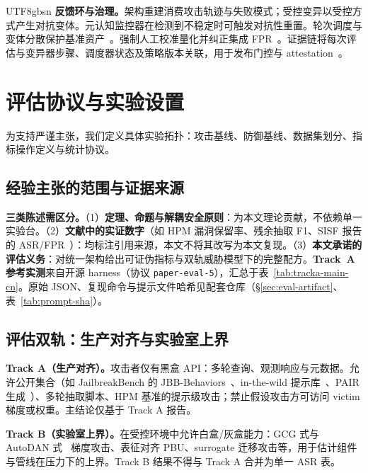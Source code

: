 \documentclass[letterpaper,twocolumn,10pt]{article}
\begin{document}
\begin{CJK}{UTF8}{gbsn}
\textbf{反馈环与治理。}架构重建消费攻击轨迹与失败模式；受控变异以受控方式产生对抗变体。元认知监控器在检测到不稳定时可触发对抗性重置。轮次调度与变体分散保护基准资产~\cite{ControlledMutation_SafetyEval}。强制人工校准量化并纠正集成 FPR~\cite{tc260-governance}。证据链将每次评估与变异器步骤、调度器状态及策略版本关联，用于发布门控与 attestation~\cite{dual-use-attestations,ControlledMutation_SafetyEval}。

\section{评估协议与实验设置}
\label{sec:evaluation}

为支持严谨主张，我们定义具体实验拓扑：攻击基线、防御基线、数据集划分、指标操作定义与统计协议。

\subsection{经验主张的范围与证据来源}
\label{sec:eval-scope}

\textbf{三类陈述需区分。}（1）\textbf{定理、命题与解耦安全原则}：为本文理论贡献，不依赖单一实验台。（2）\textbf{文献中的实证数字}（如 HPM 漏洞保留率、残余抽取 F1、SISF 报告的 ASR/FPR~\cite{sisf-arxiv}）：均标注引用来源，本文不将其改写为本文复现。（3）\textbf{本文承诺的评估义务}：对统一架构给出可证伪指标与双轨威胁模型下的完整配方。\textbf{Track~A 参考实测}来自开源 harness（协议 \texttt{paper-eval-5}），汇总于表~\ref{tab:tracka-main-cn}。原始 JSON、复现命令与提示文件哈希见配套仓库（\S\ref{sec:eval-artifact}、表~\ref{tab:prompt-sha}）。

\subsection{评估双轨：生产对齐与实验室上界}
\label{sec:eval-tracks}

\textbf{Track A（生产对齐）。}攻击者仅有黑盒 API：多轮查询、观测响应与元数据。允许公开集合（如 JailbreakBench 的 JBB-Behaviors~\cite{jailbreakbench}、in-the-wild 提示库~\cite{wild-jailbreak-prompts}、PAIR 生成~\cite{pair-jailbreak}）、多轮抽取脚本、HPM 基准的提示级攻击；禁止假设攻击方可访问 victim 梯度或权重。主结论仅基于 Track A 报告。

\textbf{Track B（实验室上界）。}在受控环境中允许白盒/灰盒能力：GCG 式与 AutoDAN 式~\cite{gcg,autodan} 梯度攻击、表征对齐 PBU、surrogate 迁移攻击等，用于估计组件与管线在压力下的上界。Track B 结果不得与 Track A 合并为单一 ASR 表。


\end{CJK}
\end{document}
